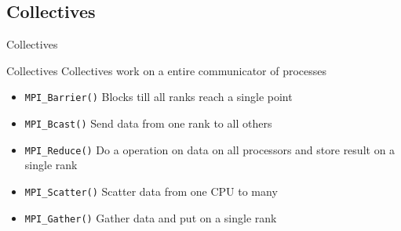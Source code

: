 \documentclass{beamer}
\begin{document}
\subsection{Collectives}
\begin{frame}{Collectives}
\begin{block}{Collectives}
 Collectives work on a entire communicator of processes
 \begin{itemize}
  \item <2->\texttt{MPI\_Barrier()} Blocks till all ranks reach a single point
  \item <2->\texttt{MPI\_Bcast()} Send data from one rank to all others
  \item <3->\texttt{MPI\_Reduce()} Do a operation on data on all processors and store result on a single rank
  \item <4->\texttt{MPI\_Scatter()} Scatter data from one CPU to many
  \item <5->\texttt{MPI\_Gather()} Gather data and put on a single rank
 \end{itemize}
\end{block}
\end{frame}
\end{document}
